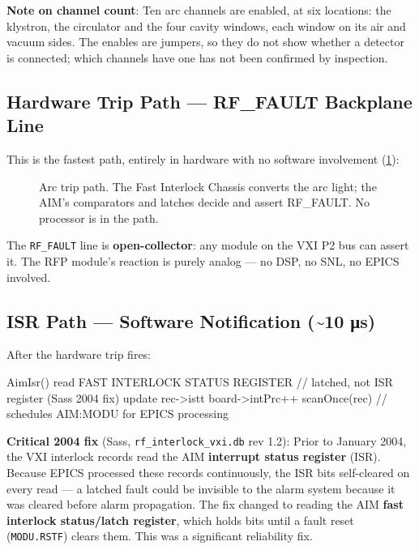 \begin{keynote}
\textbf{Note on channel count}: Ten arc channels are enabled, at six locations: the klystron, the circulator and the four cavity windows, each window on its air and vacuum sides. The enables are jumpers, so they do not show whether a detector is connected; which channels have one has not been confirmed by inspection.
\end{keynote}

\subsection{Hardware Trip Path --- RF\_FAULT Backplane Line}\label{sec:aim-rffault}


This is the fastest path, entirely in hardware with no software involvement (\cref{fig:fastic-trip}):

\begin{figure}[tbp]
\centering
\begin{fitpicture}\end{fitpicture}
\caption{Arc trip path. The Fast Interlock Chassis converts the arc light; the AIM's comparators and latches decide and assert RF\_FAULT. No processor is in the path.}\label{fig:fastic-trip}
\end{figure}

The \texttt{RF\_FAULT} line is \textbf{open-collector}: any module on the VXI P2 bus can assert it. The RFP module's reaction is purely analog --- no DSP, no SNL, no EPICS involved.

\subsection{ISR Path --- Software Notification (\textasciitilde10 μs)}\label{sec:aim-isr}


After the hardware trip fires:

\begin{codeblock}
AimIsr() {
    read FAST INTERLOCK STATUS REGISTER  // latched, not ISR register (Sass 2004 fix)
    update rec->istt
    board->intPrc++
    scanOnce(rec)   // schedules AIM:MODU for EPICS processing
}
\end{codeblock}

\begin{keynote}
\textbf{Critical 2004 fix} (Sass, \texttt{rf\_\allowbreak{}interlock\_\allowbreak{}vxi.\allowbreak{}db} rev 1.2): Prior to January 2004, the VXI interlock records read the AIM \textbf{interrupt status register} (ISR). Because EPICS processed these records continuously, the ISR bits self-cleared on every read --- a latched fault could be invisible to the alarm system because it was cleared before alarm propagation. The fix changed to reading the AIM \textbf{fast interlock status/latch register}, which holds bits until a fault reset (\texttt{MODU.RSTF}) clears them. This was a significant reliability fix.
\end{keynote}

